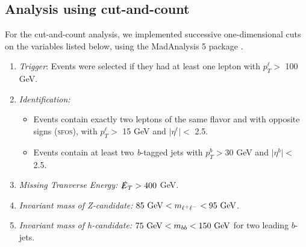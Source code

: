 \documentclass[a4paper,11pt]{article}
\providecommand{\tightlist}{%
     \setlength{\itemsep}{0pt}\setlength{\parskip}{0pt}}
\newcommand{\met}{{\slashed{E}_T}}
\begin{document}
\subsection{Analysis using cut-and-count}
\label{event-selection}

For the cut-and-count analysis, we implemented successive one-dimensional cuts
on the variables listed below, using the MadAnalysis 5 package
\cite{Conte:2012fm}.

\begin{enumerate}
  \tightlist
  \item \emph{Trigger}: Events were selected if they had at least one lepton
    with $p_{T}^\ell >$ 100 GeV. 

  \item \emph{Identification:}

    \begin{itemize}
      \item Events contain exactly two leptons of the same flavor
        and with opposite signs (\textsc{sfos}), with $p_{T}^\ell >$ 15 GeV and
        $\vert\eta^\ell\vert <$ 2.5.
      \item Events contain at least two \emph{b}-tagged jets with
        $p_{T}^b > 30$ GeV and $\vert\eta^b\vert <$ 2.5.
    \end{itemize}

   \item \emph{Missing Tranverse Energy:}  $\met> 400$ GeV.

 \item \emph{Invariant mass of Z-candidate:}  $85\ {\rm GeV}<m_{\ell^{+}\ell^{-}}<95\ {\rm GeV}$.

  \item \emph{Invariant mass of h-candidate:} $75\ {\rm GeV}<m_{bb}<150\ {\rm GeV}$ for two leading $b$-jets.



\end{enumerate}
\end{document}
